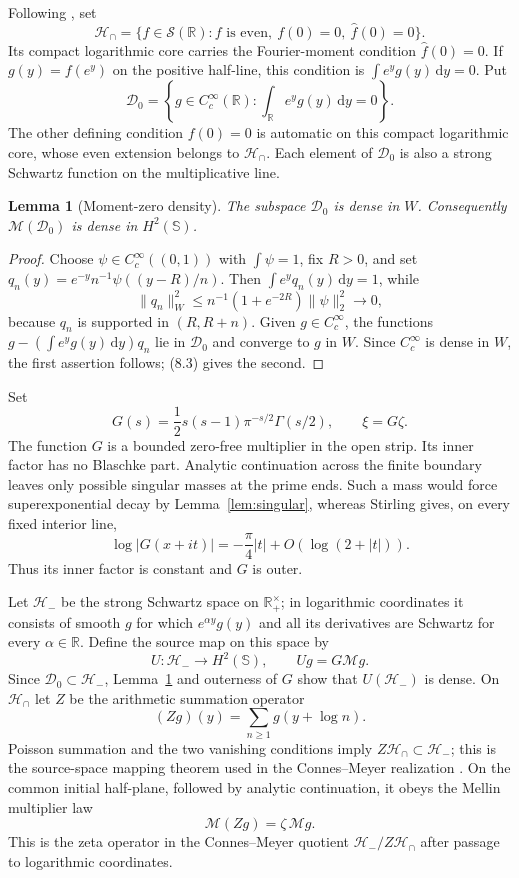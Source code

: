 \documentclass[11pt]{article}
\newtheorem{lemma}[theorem]{Lemma}
\theoremstyle{definition}
\theoremstyle{remark}
\newcommand{\R}{\mathbb R}
\newcommand{\D}{\mathcal D}
\newcommand{\Hh}{\mathcal H}
\newcommand{\cM}{\mathcal M}
\newcommand{\dd}{\,\mathrm d}
\begin{document}
Following \cite{Li2019}, set
\[
 \Hh_\cap=\{f\in\mathcal S(\R):f\text{ is even},\ f(0)=0,
                   \ \widehat f(0)=0\}.               \tag{8.4}
\]
Its compact logarithmic core carries the Fourier-moment condition
$\widehat f(0)=0$.  If $g(y)=f(e^y)$ on the positive half-line, this condition
is $\int e^yg(y)\dd y=0$.  Put
\[
       \D_0=\left\{g\in C_c^\infty(\R):
                    \int_\R e^yg(y)\dd y=0\right\}.   \tag{8.5}
\]
The other defining condition $f(0)=0$ is automatic on this compact logarithmic
core, whose even extension belongs to $\Hh_\cap$.  Each element of $\D_0$ is
also a strong Schwartz function on the multiplicative line.

\begin{lemma}[Moment-zero density]\label{lem:moment-density}
The subspace $\D_0$ is dense in $W$.  Consequently $\cM(\D_0)$ is dense in
$H^2(\mathbb S)$.
\end{lemma}

\begin{proof}
Choose $\psi\in C_c^\infty((0,1))$ with $\int\psi=1$, fix $R>0$, and set
$q_n(y)=e^{-y}n^{-1}\psi((y-R)/n)$.  Then
$\int e^yq_n(y)\dd y=1$, while
\[
 \|q_n\|_W^2
 \le n^{-1}(1+e^{-2R})\|\psi\|_2^2\longrightarrow0, \tag{8.6}
\]
because $q_n$ is supported in $(R,R+n)$.  Given $g\in C_c^\infty$, the
functions $g-(\int e^yg(y)\dd y)q_n$ lie in $\D_0$ and converge to $g$ in $W$.
Since $C_c^\infty$ is dense in $W$, the first assertion follows; (8.3) gives
the second.
\end{proof}

Set
\[
       G(s)=\frac12s(s-1)\pi^{-s/2}\Gamma(s/2),
       \qquad \xi=G\zeta.                             \tag{8.7}
\]
The function $G$ is a bounded zero-free multiplier in the open strip.  Its
inner factor has no Blaschke part.  Analytic continuation across the finite
boundary leaves only possible singular masses at the prime ends.  Such a mass
would force superexponential decay by Lemma~\ref{lem:singular}, whereas
Stirling gives, on every fixed interior line,
\[
             \log|G(x+it)|=-\frac{\pi}{4}|t|+O(\log(2+|t|)).
\]
Thus its inner factor is constant and $G$ is outer.

Let $\Hh_-$ be the strong Schwartz space on $\R_+^\times$; in logarithmic
coordinates it consists of smooth $g$ for which $e^{\alpha y}g(y)$ and all its
derivatives are Schwartz for every $\alpha\in\R$.  Define the source map on
this space by
\[
               U:\Hh_-\longrightarrow H^2(\mathbb S),
               \qquad Ug=G\cM g.                     \tag{8.8}
\]
Since $\D_0\subset\Hh_-$, Lemma~\ref{lem:moment-density} and outerness of $G$
show that $U(\Hh_-)$ is dense.  On $\Hh_\cap$ let $Z$ be the arithmetic
summation operator
\[
                    (Zg)(y)=\sum_{n\ge1}g(y+\log n).
\]
Poisson summation and the two vanishing conditions imply
$Z\Hh_\cap\subset\Hh_-$; this is the source-space mapping theorem used in the
Connes--Meyer realization \cite{Meyer2005,Li2019}.
On the common initial half-plane, followed by analytic continuation, it obeys
the Mellin multiplier law
\[
                        \cM(Zg)=\zeta\,\cM g.         \tag{8.9}
\]
This is the zeta operator in the Connes--Meyer quotient
$\Hh_-/Z\Hh_\cap$ after passage to logarithmic coordinates.
\end{document}
